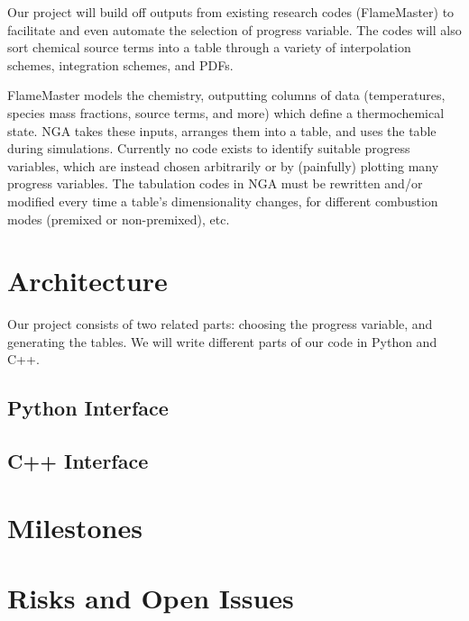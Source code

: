 \documentclass[11pt]{article}
\begin{document}
Our project will build off outputs from existing research codes
(FlameMaster) to facilitate and even automate the selection of
progress variable. The codes will also sort chemical source terms into
a table through a variety of interpolation schemes, integration
schemes, and PDFs. 



FlameMaster models the chemistry, outputting columns of data
(temperatures, species mass fractions, source terms, and more) which
define a thermochemical state. NGA takes these inputs, arranges them
into a table, and uses the table during simulations. Currently no code
exists to identify suitable progress variables, which are instead
chosen arbitrarily or by (painfully) plotting many progress
variables. The tabulation codes in NGA must be rewritten and/or
modified every time a table's dimensionality changes, for different
combustion modes (premixed or non-premixed), etc.


\section{Architecture}
Our project consists of two related parts: choosing the progress
variable, and generating the tables. We will write different parts of
our code in Python and C++.



\subsection{Python Interface}




\subsection{C++ Interface}



\section{Milestones}




\section{Risks and Open Issues}

\end{document}
